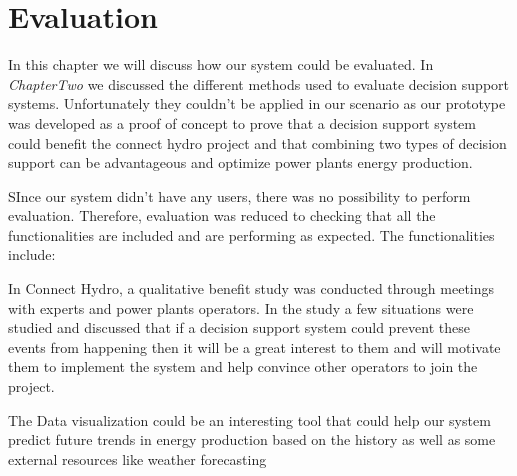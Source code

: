 \chapter{Evaluation}
\label{ChapterSix}
In this chapter we will discuss how our system could be evaluated. In \textit{ChapterTwo} we discussed the different methods used to evaluate decision support systems. Unfortunately they couldn't be applied in our scenario as our prototype was developed as a proof of concept to prove that a decision support system could benefit the connect hydro project and that combining two types of decision support can be advantageous and optimize power plants energy production.

SInce our system didn't have any users, there was no possibility to perform evaluation. Therefore, evaluation was reduced to checking that all the functionalities are included and are performing as expected. The functionalities include:


In Connect Hydro, a qualitative benefit study was conducted through meetings with experts and power plants operators. In the study a few situations were studied and discussed that if a decision support system could prevent these events from happening then it will be a great interest to them and will motivate them to implement the system and help convince other operators to join the project.

The Data visualization could be an interesting tool that could help our system predict future trends in energy production based on the history as well as some external resources like weather forecasting